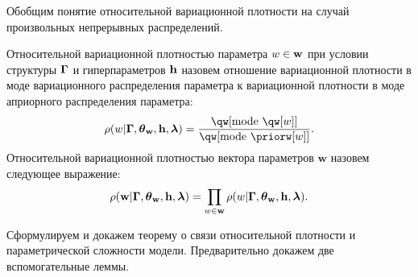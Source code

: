 Обобщим понятие относительной вариационной плотности на случай произвольных непрерывных распределений.
\begin{defin}
Относительной вариационной   плотностью параметра $w \in \mathbf{w}$  при условии структуры $\boldsymbol{\Gamma}$ и гиперпараметров $\mathbf{h}$ назовем отношение вариационной плотности в моде вариационного распределения параметра к вариационной плотности в моде априорного распределения параметра:
\[
\rho(w|\G,\tetaw, \h,\lam)=\frac{\qw[\text{mode}~\qw[w]]}{\qw[\text{mode}~{\priorw[w]}]}.
\]
Относительной вариационной плотностью вектора параметров $\mathbf{w}$ назовем следующее выражение:
\[
    {\rho}(\mathbf{w}|\boldsymbol{\Gamma}, \boldsymbol{\theta}_\mathbf{w}, \mathbf{h},\boldsymbol{\lambda}) = \prod_{w \in \mathbf{w}}\rho(w|\boldsymbol{\Gamma},\boldsymbol{\theta}_\mathbf{w},\mathbf{h},\boldsymbol{\lambda}).
\]

\end{defin}

Сформулируем и докажем теорему о связи относительной плотности и параметрической сложности модели. Предварительно докажем две вспомогательные леммы.

